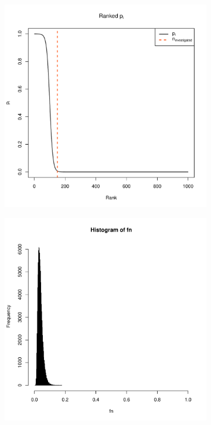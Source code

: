 \documentclass{article}
\begin{document}
\begin{figure}[!htb]
    \vspace{1em}
    
    \begin{subfigure}{0.45\textwidth}
        \centering
        \includegraphics[width=\textwidth, trim=1cm 1cm 1cm .5cm, clip]{ranked_thorough.pdf}
    \end{subfigure}
    \hfill
    \begin{subfigure}{0.45\textwidth}
        \centering
        \includegraphics[page=2, width=\textwidth, trim=1cm 1cm 1cm .5cm, clip]{coverage_thorough.pdf}
    \end{subfigure}
    \label{fig:figures}
\end{figure}
\end{document}
